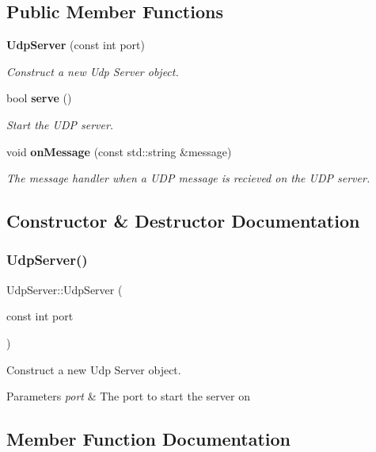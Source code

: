 \subsection*{Public Member Functions}
\begin{DoxyCompactItemize}
\item 
\textbf{ Udp\+Server} (const int port)
\begin{DoxyCompactList}\small\item\em Construct a new Udp Server object. \end{DoxyCompactList}\item 
bool \textbf{ serve} ()
\begin{DoxyCompactList}\small\item\em Start the U\+DP server. \end{DoxyCompactList}\item 
void \textbf{ on\+Message} (const std\+::string \&message)
\begin{DoxyCompactList}\small\item\em The message handler when a U\+DP message is recieved on the U\+DP server. \end{DoxyCompactList}\end{DoxyCompactItemize}


\subsection{Constructor \& Destructor Documentation}
\mbox{\label{class_udp_server_abb91737f6586814939681baabb0cf9c7}} 
\subsubsection{Udp\+Server()}
{\footnotesize\ttfamily Udp\+Server\+::\+Udp\+Server (\begin{DoxyParamCaption}\item[{const int}]{port }\end{DoxyParamCaption})}



Construct a new Udp Server object. 


\begin{DoxyParams}{Parameters}
{\em port} & The port to start the server on \\
\hline
\end{DoxyParams}


\subsection{Member Function Documentation}
\mbox{\label{class_udp_server_a71fcac42f7f8592434c6c1b580b1506c}} 
